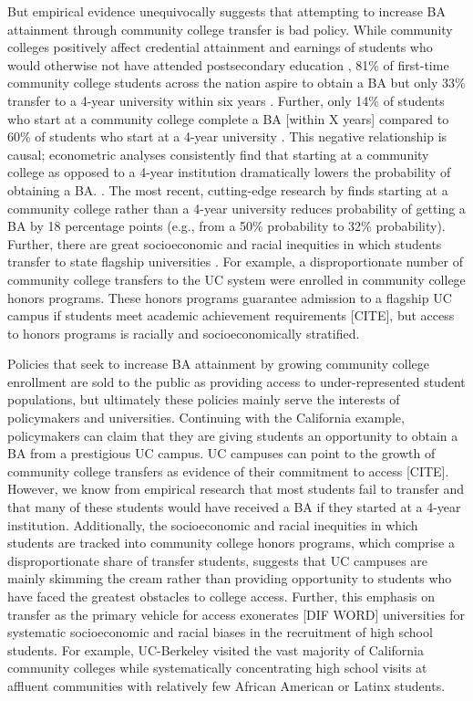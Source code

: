 \documentclass[twoside]{article}
\begin{document}
But empirical evidence unequivocally suggests that attempting to increase BA attainment through community college transfer is bad policy.  While community colleges positively affect credential attainment and earnings of students who would otherwise not have attended postsecondary education \citep[e.g., ][]{RN4404}, 81\% of first-time community college students across the nation aspire to obtain a BA but only 33\% transfer to a 4-year university within six years \citep{RN4406}.  Further, only 14\% of students who start at a community college complete a BA [within X years] compared to 60\% of students who start at a 4-year university \citep{RN4406}.  This negative relationship is causal; econometric analyses consistently find that starting at a community college as opposed to a 4-year institution dramatically lowers the probability of obtaining a BA. \citep[e.g., ][]{RN4284,RN2261,RN4292,RN4405}. The most recent, cutting-edge research by \cite{RN4404} finds starting at a community college rather than a 4-year university reduces probability of getting a BA by 18 percentage points (e.g., from a 50\% probability to 32\% probability).  Further, there are great socioeconomic and racial inequities in which students transfer to state flagship universities \citep{RN1492}. For example, a disproportionate number of community college transfers to the UC system were enrolled in community college honors programs.  These honors programs guarantee admission to a flagship UC campus if students meet academic achievement requirements [CITE], but access to honors programs is racially and socioeconomically stratified.

Policies that seek to increase BA attainment by growing community college enrollment are sold to the public as providing access to under-represented student populations, but ultimately these policies mainly serve the interests of policymakers and universities.  Continuing with the California example, policymakers can claim that they are giving students an opportunity to obtain a BA from a prestigious UC campus.  UC campuses can point to the growth of community college transfers as evidence of their commitment to access [CITE]. However, we know from empirical research that most students fail to transfer and that many of these students would have received a BA if they started at a 4-year institution. Additionally, the socioeconomic and racial inequities in which students are tracked into community college honors programs, which comprise a disproportionate share of transfer students, suggests that UC campuses are mainly skimming the cream rather than providing opportunity to students who have faced the greatest obstacles to college access. Further, this emphasis on transfer as the primary vehicle for access exonerates [DIF WORD] universities for systematic socioeconomic and racial biases in the recruitment of high school students.  For example, UC-Berkeley visited the vast majority of California community colleges while systematically concentrating high school visits at affluent communities with relatively few African American or Latinx students.
\end{document}
